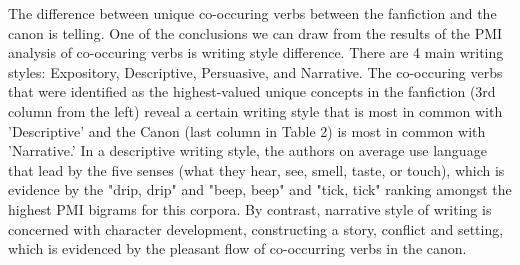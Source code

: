  The difference between unique co-occuring verbs between the fanfiction and the canon is telling.  One of the conclusions we can draw from the results of the PMI analysis of co-occuring verbs is writing style difference.  There are 4 main writing styles: Expository, Descriptive, Persuasive, and Narrative. The co-occuring verbs that were identified as the highest-valued unique concepts in the fanfiction (3rd column from the left) reveal a certain writing style that is most in common with 'Descriptive' and the Canon (last column in Table 2) is most in common with 'Narrative.'  In a descriptive writing style, the authors on average use language that lead by the five senses (what they hear, see, smell, taste, or touch), which is evidence by the "drip, drip" and "beep, beep" and "tick, tick" ranking amongst the highest PMI bigrams for this corpora.  By contrast, narrative style of writing is concerned with character development, constructing a story, conflict and setting, which is evidenced by the pleasant flow of co-occurring verbs in the canon.
 
